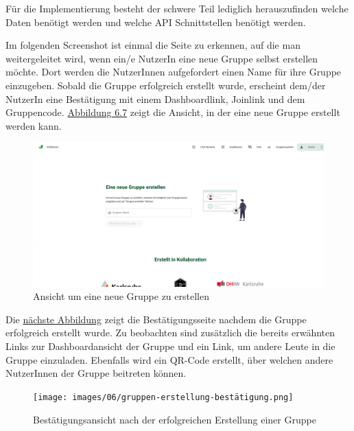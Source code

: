 Für die Implementierung besteht der schwere Teil lediglich herauszufinden welche Daten benötigt werden und welche \acs{API} Schnittstellen benötigt werden.

Im folgenden Screenshot ist einmal die Seite zu erkennen, auf die man weitergeleitet wird, wenn ein/e NutzerIn eine neue Gruppe selbst erstellen möchte.
Dort werden die NutzerInnen aufgefordert einen Name für ihre Gruppe einzugeben.
Sobald die Gruppe erfolgreich erstellt wurde, erscheint dem/der NutzerIn eine Bestätigung mit einem Dashboardlink, Joinlink und dem Gruppencode.
\hyperref[label]{Abbildung 6.7} zeigt die Ansicht, in der eine neue Gruppe erstellt werden kann.

\begin{figure}[H]
    \centering
    \includegraphics[width=1\textwidth]{images/06/gruppe-erstellen-design.png}
    \caption{Ansicht um eine neue Gruppe zu erstellen}
    \label{fig:neue-gruppe-design}
\end{figure}

Die \hyperref[fig:gruppe-erfolgreich-erstellt]{nächste Abbildung} zeigt die Bestätigungsseite nachdem die Gruppe erfolgreich erstellt wurde.
Zu beobachten sind zusätzlich die bereits erwähnten Links zur Dashboardansicht der Gruppe und ein Link, um andere Leute in die Gruppe einzuladen.
Ebenfalls wird ein QR-Code erstellt, über welchen andere NutzerInnen der Gruppe beitreten können.

\begin{figure}[H]
    \centering
    \texttt{[image: images/06/gruppen-erstellung-bestätigung.png]}
    \caption{Bestätigungsansicht nach der erfolgreichen Erstellung einer Gruppe}
    \label{fig:gruppe-erfolgreich-erstellt}
\end{figure}

\newpage




